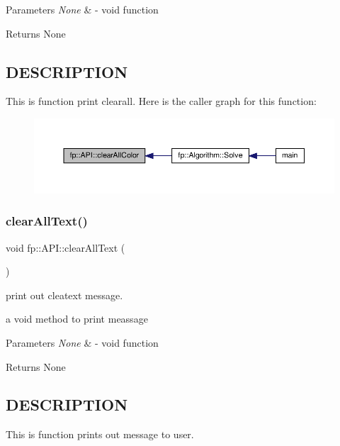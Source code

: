 \begin{DoxyParams}{Parameters}
{\em None} & -\/ void function \\
\hline
\end{DoxyParams}
\begin{DoxyReturn}{Returns}
None 
\end{DoxyReturn}
\hypertarget{_m_a_z_e_8h_DESCRIPTION}{}\subsection{D\+E\+S\+C\+R\+I\+P\+T\+I\+ON}\label{_m_a_z_e_8h_DESCRIPTION}
This is function print clearall. Here is the caller graph for this function\+:
\nopagebreak
\begin{figure}[H]
\begin{center}
\leavevmode
\includegraphics[width=350pt]{classfp_1_1_a_p_i_a68f86debe50e6e2ae0c1fde795a1cfb6_icgraph}
\end{center}
\end{figure}
\mbox{\label{classfp_1_1_a_p_i_ae0b4d27428aad11e98647b88947f2c34}} 
\subsubsection{\texorpdfstring{clear\+All\+Text()}{clearAllText()}}
{\footnotesize\ttfamily void fp\+::\+A\+P\+I\+::clear\+All\+Text (\begin{DoxyParamCaption}{ }\end{DoxyParamCaption})\hspace{0.3cm}{\ttfamily [static]}}



print out cleatext message. 

a void method to print meassage


\begin{DoxyParams}{Parameters}
{\em None} & -\/ void function \\
\hline
\end{DoxyParams}
\begin{DoxyReturn}{Returns}
None 
\end{DoxyReturn}
\hypertarget{_m_a_z_e_8h_DESCRIPTION}{}\subsection{D\+E\+S\+C\+R\+I\+P\+T\+I\+ON}\label{_m_a_z_e_8h_DESCRIPTION}
This is function prints out message to user. \mbox{\label{classfp_1_1_a_p_i_a5ab1560f68fb54993c8b3316177040a5}} 
